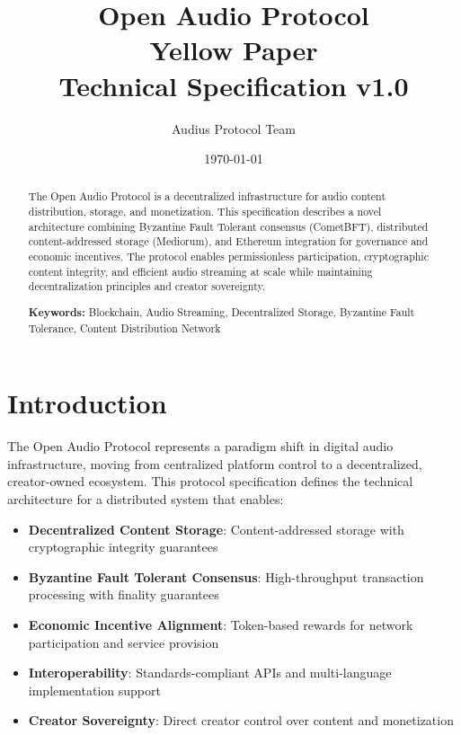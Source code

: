 \documentclass[11pt,a4paper]{article}
\begin{document}
\title{\Huge\textbf{Open Audio Protocol} \\ \Large Yellow Paper \\ \normalsize Technical Specification v1.0}
\author{Audius Protocol Team}
\date{\today}

\maketitle

\begin{abstract}
  The Open Audio Protocol is a decentralized infrastructure for audio content distribution, storage, and monetization. This specification describes a novel architecture combining Byzantine Fault Tolerant consensus (CometBFT), distributed content-addressed storage (Mediorum), and Ethereum integration for governance and economic incentives. The protocol enables permissionless participation, cryptographic content integrity, and efficient audio streaming at scale while maintaining decentralization principles and creator sovereignty.

  \textbf{Keywords:} Blockchain, Audio Streaming, Decentralized Storage, Byzantine Fault Tolerance, Content Distribution Network
\end{abstract}

\newpage
\tableofcontents
\newpage

\section{Introduction}

The Open Audio Protocol represents a paradigm shift in digital audio infrastructure, moving from centralized platform control to a decentralized, creator-owned ecosystem. This protocol specification defines the technical architecture for a distributed system that enables:

\begin{itemize}
  \item \textbf{Decentralized Content Storage}: Content-addressed storage with cryptographic integrity guarantees
  \item \textbf{Byzantine Fault Tolerant Consensus}: High-throughput transaction processing with finality guarantees
  \item \textbf{Economic Incentive Alignment}: Token-based rewards for network participation and service provision
  \item \textbf{Interoperability}: Standards-compliant APIs and multi-language implementation support
  \item \textbf{Creator Sovereignty}: Direct creator control over content and monetization
\end{itemize}
\end{document}
